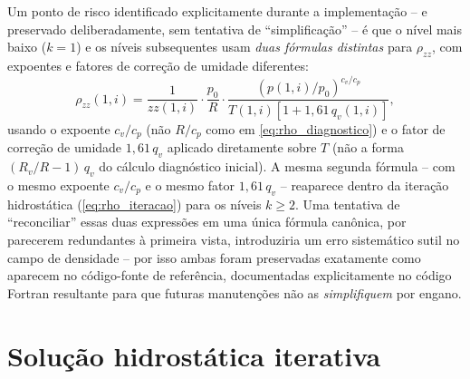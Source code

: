 \begin{caixaachado}
Um ponto de risco identificado explicitamente durante a implementação --
e preservado deliberadamente, sem tentativa de ``simplificação'' -- é
que o nível mais baixo ($k=1$) e os níveis subsequentes usam
\emph{duas fórmulas distintas} para $\rho_{zz}$, com expoentes e fatores
de correção de umidade diferentes:
\begin{equation}
  \rho_{zz}(1,i) = \frac{1}{zz(1,i)}\cdot\frac{p_0}{R}\cdot
  \frac{\left(p(1,i)/p_0\right)^{c_v/c_p}}{T(1,i)\left[1+1{,}61\,q_v(1,i)\right]},
  \label{eq:rho_nivel1}
\end{equation}
usando o expoente $c_v/c_p$ (não $R/c_p$ como em
\cref{eq:rho_diagnostico}) e o fator de correção de umidade $1{,}61\,q_v$
aplicado diretamente sobre $T$ (não a forma $(R_v/R-1)\,q_v$ do cálculo
diagnóstico inicial). A mesma segunda fórmula -- com o mesmo expoente
$c_v/c_p$ e o mesmo fator $1{,}61\,q_v$ -- reaparece dentro da iteração
hidrostática (\cref{eq:rho_iteracao}) para os níveis $k\ge 2$. Uma
tentativa de ``reconciliar'' essas duas expressões em uma única fórmula
canônica, por parecerem redundantes à primeira vista, introduziria um
erro sistemático sutil no campo de densidade -- por isso ambas foram
preservadas exatamente como aparecem no código-fonte de referência,
documentadas explicitamente no código Fortran resultante para que futuras
manutenções não as \emph{simplifiquem} por engano.
\end{caixaachado}

\section{Solução hidrostática iterativa}
\label{sec:iteracao}

